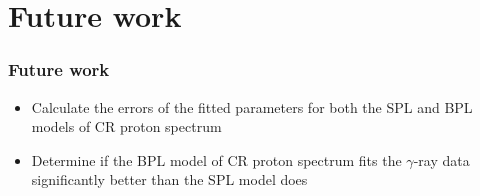 \documentclass{beamer}
\begin{document}



\section{Future work}
\begin{frame}
\frametitle{Future work}
\begin{itemize}
  \item Calculate the errors of the fitted parameters for both the SPL and BPL models of CR proton spectrum
  \item Determine if the BPL model of CR proton spectrum fits the $\gamma$-ray data significantly better than the SPL model does
\end{itemize}
\end{frame}
\end{document}
